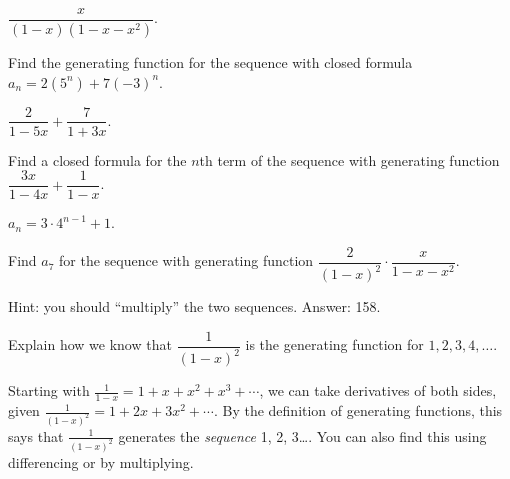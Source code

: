 \begin{questions}
	\begin{answer}
		$\dfrac{x}{(1-x)(1-x-x^2)}$.  %
	\end{answer}
	
	
	
	


\question Find the generating function for the sequence with closed formula $a_n = 2(5^n) + 7(-3)^n$.

	\begin{answer}
		$\dfrac{2}{1-5x} + \dfrac{7}{1+3x}$.  %
	\end{answer}
	
	
	
	


\question Find a closed formula for the $n$th term of the sequence with generating function $\dfrac{3x}{1-4x} + \dfrac{1}{1-x}$.

	\begin{answer}
		$a_n = 3\cdot 4^{n-1} + 1$.  %
	\end{answer}
	
	
	
	


\question Find $a_7$ for the sequence with generating function $\dfrac{2}{(1-x)^2}\cdot\dfrac{x}{1-x-x^2}$.

	\begin{answer}
		Hint: you should ``multiply'' the two sequences.  Answer: 158.  %
	\end{answer}
	




\question Explain how we know that $\dfrac{1}{(1-x)^2}$ is the generating function for $1, 2, 3, 4, \ldots$.

	\begin{answer}
		Starting with $\frac{1}{1-x} = 1 + x + x^2 + x^3 +\cdots$, we can take derivatives of both sides, given $\frac{1}{(1-x)^2} = 1 + 2x + 3x^2 + \cdots$.  By the definition of generating functions, this says that $\frac{1}{(1-x)^2}$ generates the {\em sequence} 1, 2, 3\ldots.  You can also find this using differencing or by multiplying. 
	\end{answer}






\end{questions}
